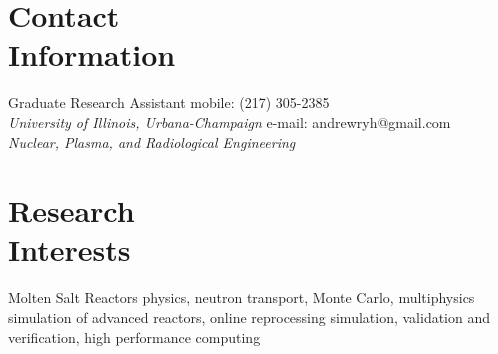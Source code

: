 \documentclass[margin,line]{resume}
\begin{document}
\begin{resume}

    \section{\mysidestyle Contact\\Information}

    Graduate Research Assistant \hfill mobile: (217) 305-2385 \vspace{0mm}\\\vspace{0mm}
    \hspace{-1.35mm}\textsl{University of Illinois, Urbana-Champaign}
        \hfill e-mail: andrewryh@gmail.com            \vspace{0mm}\\\vspace{0mm}%
    \textsl{Nuclear, Plasma, and Radiological Engineering}
       
    \section{\mysidestyle Research\\Interests}
		Molten Salt Reactors physics, neutron transport, Monte Carlo, 
		multiphysics simulation of advanced reactors, online reprocessing 
		simulation, validation and verification, high performance computing

\end{resume}
\end{document}
